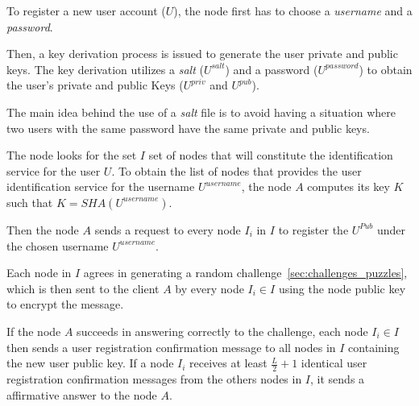 To register a new user account ($U$), the node first
has to choose a \textit{username} and a \textit{password}.
% 
% 

Then, a key derivation process is issued to generate the user private and
public keys. The
key derivation utilizes a \textit{salt} ($U^{salt}$) and a password ($U^{password}$) to
obtain the user's private and public Keys
($U^{priv}$ and $U^{pub}$).

The main idea behind the use of a \textit{salt} file is to avoid having a
situation where two users with the same password have the same private and
public keys.

The node  looks for the set $I$ set of nodes that will constitute the
identification service for the user $U$. To obtain the list of nodes that provides the user identification service for
the username $U^{username}$, the node $A$ computes its key $K$ such that $K =
SHA(U^{username})$. 

Then the node $A$ sends a request to every node $I_i$ in $I$ to register the
$U^{Pub}$ under the chosen  username  $U^{username}$.


Each node in $I$ agrees in generating a random challenge~\ref{sec:challenges_puzzles}, which is then sent to the
client $A$ by every node $I_i \in I$ using the node public key to encrypt the
message.

If the node $A$ succeeds in answering correctly to the challenge, each node $I_i \in I$ then sends a user registration confirmation message to all nodes
in $I$ containing the new user public key. If a node $I_i$ receives at
least $\frac{L}{2} + 1$ identical user registration confirmation messages from
the others nodes in $I$, it sends a affirmative answer to the node $A$.

